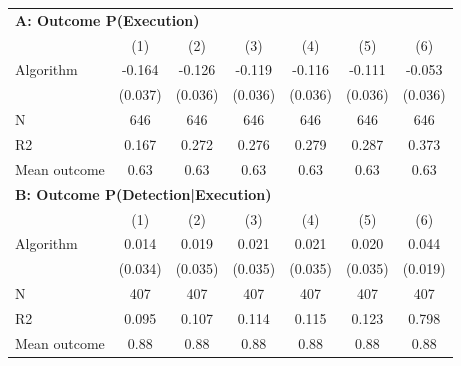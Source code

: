 \begin{tabular}{lcccccc} \toprule
\multicolumn{7}{l}{\textbf{A: Outcome P(Execution)}} \\ \multicolumn{1}{l}{} & (1) & (2) & (3) & (4) & (5) & (6) \\ \midrule
Algorithm   &      -0.164\sym{***}&      -0.126\sym{***}&      -0.119\sym{***}&      -0.116\sym{***}&      -0.111\sym{***}&      -0.053         \\
            &     (0.037)         &     (0.036)         &     (0.036)         &     (0.036)         &     (0.036)         &     (0.036)         \\
\midrule
N           &         646         &         646         &         646         &         646         &         646         &         646         \\
R2          &       0.167         &       0.272         &       0.276         &       0.279         &       0.287         &       0.373         \\
Mean outcome&        0.63         &        0.63         &        0.63         &        0.63         &        0.63         &        0.63         \\

\midrule \multicolumn{7}{l}{\textbf{B: Outcome P(Detection|Execution)}} \\ \multicolumn{1}{l}{} & (1) & (2) & (3) & (4) & (5) & (6) \\ \midrule
Algorithm   &       0.014         &       0.019         &       0.021         &       0.021         &       0.020         &       0.044\sym{**} \\
            &     (0.034)         &     (0.035)         &     (0.035)         &     (0.035)         &     (0.035)         &     (0.019)         \\
\midrule
N           &         407         &         407         &         407         &         407         &         407         &         407         \\
R2          &       0.095         &       0.107         &       0.114         &       0.115         &       0.123         &       0.798         \\
Mean outcome&        0.88         &        0.88         &        0.88         &        0.88         &        0.88         &        0.88         \\


\end{tabular}

